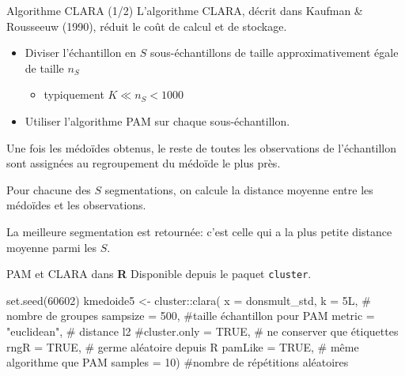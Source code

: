 \documentclass[
  ignorenonframetext,
]{beamer}
\newenvironment{Shaded}{\begin{snugshade}}{\end{snugshade}}
\newcommand{\AttributeTok}[1]{\textcolor[rgb]{0.40,0.45,0.13}{#1}}
\newcommand{\CommentTok}[1]{\textcolor[rgb]{0.37,0.37,0.37}{#1}}
\newcommand{\ConstantTok}[1]{\textcolor[rgb]{0.56,0.35,0.01}{#1}}
\newcommand{\DecValTok}[1]{\textcolor[rgb]{0.68,0.00,0.00}{#1}}
\newcommand{\FunctionTok}[1]{\textcolor[rgb]{0.28,0.35,0.67}{#1}}
\newcommand{\NormalTok}[1]{\textcolor[rgb]{0.00,0.23,0.31}{#1}}
\newcommand{\OtherTok}[1]{\textcolor[rgb]{0.00,0.23,0.31}{#1}}
\newcommand{\SpecialCharTok}[1]{\textcolor[rgb]{0.37,0.37,0.37}{#1}}
\newcommand{\StringTok}[1]{\textcolor[rgb]{0.13,0.47,0.30}{#1}}
\providecommand{\tightlist}{%
  \setlength{\itemsep}{0pt}\setlength{\parskip}{0pt}}\usepackage{longtable,booktabs,array}
\begin{document}
\begin{frame}{Algorithme CLARA (1/2)}
\protect\hypertarget{algorithme-clara-12}{}
L'algorithme CLARA, décrit dans Kaufman \& Rousseeuw (1990), réduit le
coût de calcul et de stockage.

\begin{itemize}
\tightlist
\item
  Diviser l'échantillon en \(S\) sous-échantillons de taille
  approximativement égale de taille \(n_S\)

  \begin{itemize}
  \tightlist
  \item
    typiquement \(K \ll n_S < 1000\)
  \end{itemize}
\item
  Utiliser l'algorithme PAM sur chaque sous-échantillon.
\end{itemize}

Une fois les médoïdes obtenus, le reste de toutes les observations de
l'échantillon sont assignées au regroupement du médoïde le plus près.

Pour chacune des \(S\) segmentations, on calcule la distance moyenne
entre les médoïdes et les observations.

La meilleure segmentation est retournée: c'est celle qui a la plus
petite distance moyenne parmi les \(S\).
\end{frame}

\begin{frame}[fragile]{PAM et CLARA dans \textbf{R}}
\protect\hypertarget{pam-et-clara-dans-r}{}
Disponible depuis le paquet \texttt{cluster}.

\begin{Shaded}
\begin{Highlighting}[numbers=left,,]
\FunctionTok{set.seed}\NormalTok{(}\DecValTok{60602}\NormalTok{)}
\NormalTok{kmedoide5 }\OtherTok{\textless{}{-}}\NormalTok{ cluster}\SpecialCharTok{::}\FunctionTok{clara}\NormalTok{(}
   \AttributeTok{x =}\NormalTok{ donsmult\_std,}
   \AttributeTok{k =}\NormalTok{ 5L, }\CommentTok{\# nombre de groupes}
   \AttributeTok{sampsize =} \DecValTok{500}\NormalTok{, }\CommentTok{\#taille échantillon pour PAM}
   \AttributeTok{metric =} \StringTok{"euclidean"}\NormalTok{, }\CommentTok{\# distance l2}
   \CommentTok{\#cluster.only = TRUE, \# ne conserver que étiquettes}
   \AttributeTok{rngR =} \ConstantTok{TRUE}\NormalTok{, }\CommentTok{\# germe aléatoire depuis R}
   \AttributeTok{pamLike =} \ConstantTok{TRUE}\NormalTok{, }\CommentTok{\# même algorithme que PAM}
   \AttributeTok{samples =} \DecValTok{10}\NormalTok{) }\CommentTok{\#nombre de répétitions aléatoires}
\end{Highlighting}
\end{Shaded}
\end{frame}
\end{document}
